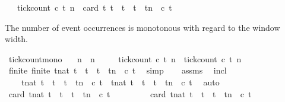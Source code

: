 \begin{isabellebody}
\ \ \ {\isacartoucheopen}tick{\isacharunderscore}count\ c\ t\ n\ {\isasymequiv}\ card\ {\isacharbraceleft}t{\isachardot}\ t\ {\isasymle}\ t\ {\isasymand}\ t\ {\isacharless}\ tn\ {\isasymand}\ c\ t{\isacharbraceright}{\isacartoucheclose}%
\begin{isamarkuptext}%
The number of event occurrences is monotonous with regard to the window width.%
\end{isamarkuptext}\isamarkuptrue%
\isamarkupfalse%
\ tick{\isacharunderscore}count{\isacharunderscore}mono{\isacharcolon}\isanewline
\ \ \ {\isacartoucheopen}n{\isacharprime}\ {\isasymge}\ n{\isacartoucheclose}\isanewline
\ \ \ \ \ {\isacartoucheopen}tick{\isacharunderscore}count\ c\ t\ n{\isacharprime}\ {\isasymge}\ tick{\isacharunderscore}count\ c\ t\ n{\isacartoucheclose}\isanewline
%
\isadelimproof
%
\endisadelimproof
%
\isatagproof
{}\isamarkupfalse%
\ {\isacharminus}\isanewline
\ \ \isamarkupfalse%
\ finite{\isacharcolon}\ {\isacartoucheopen}finite\ {\isacharbraceleft}t{\isacharcolon}{\isacharcolon}nat{\isachardot}\ t\ {\isasymle}\ t\ {\isasymand}\ t\ {\isacharless}\ tn{\isacharprime}\ {\isasymand}\ c\ t{\isacharbraceright}{\isacartoucheclose}\ \isamarkupfalse%
\ simp\isanewline
\ \ \isamarkupfalse%
\ assms\ \isamarkupfalse%
\ incl{\isacharcolon}\isanewline
\ \ \ \ {\isacartoucheopen}{\isacharbraceleft}t{\isacharcolon}{\isacharcolon}nat{\isachardot}\ t\ {\isasymle}\ t\ {\isasymand}\ t\ {\isacharless}\ tn\ {\isasymand}\ c\ t{\isacharbraceright}\ {\isasymsubseteq}\ {\isacharbraceleft}t{\isacharcolon}{\isacharcolon}nat{\isachardot}\ t\ {\isasymle}\ t\ {\isasymand}\ t\ {\isacharless}\ tn{\isacharprime}\ {\isasymand}\ c\ t{\isacharbraceright}{\isacartoucheclose}\ \isamarkupfalse%
\ auto\isanewline
\ \ \isamarkupfalse%
\ {\isacartoucheopen}card\ {\isacharbraceleft}t{\isacharcolon}{\isacharcolon}nat{\isachardot}\ t\ {\isasymle}\ t\ {\isasymand}\ t\ {\isacharless}\ tn\ {\isasymand}\ c\ t{\isacharbraceright}\isanewline
\ \ \ \ \ \ \ \ {\isasymle}\ card\ {\isacharbraceleft}t{\isacharcolon}{\isacharcolon}nat{\isachardot}\ t\ {\isasymle}\ t\ {\isasymand}\ t\ {\isacharless}\ tn{\isacharprime}\ {\isasymand}\ c\ t{\isacharbraceright}{\isacartoucheclose}\isanewline

\end{isabellebody}
